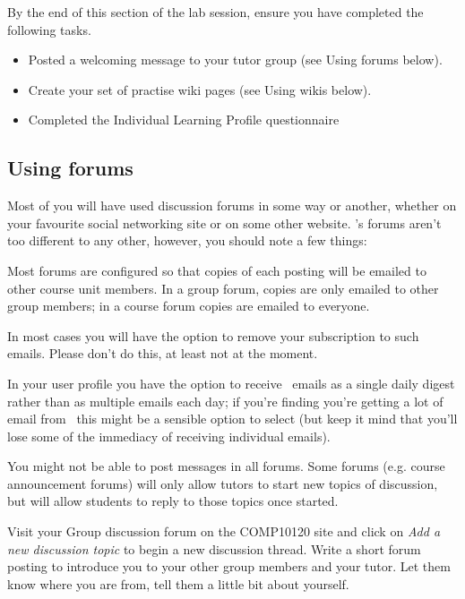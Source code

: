 By the end of this section of the lab session, ensure you have completed the following tasks.

\begin{itemize}
\item 
Posted a welcoming message to your tutor group (see Using forums below).

\item Create your set of practise wiki pages (see Using wikis below).

\item Completed the Individual Learning Profile questionnaire
\end{itemize}


\subsection{Using forums}
\label{sec:using-forums}


Most of you will have used discussion forums in some way or another, whether on your favourite social networking site or on some other website. \Moodle's forums aren't too different to any other, however, you should note a few things:

Most forums are configured so that copies of each posting will be emailed to other course unit members. In a group forum, copies are only emailed to other group members; in a course forum copies are emailed to everyone.

In most cases you will have the option to remove your subscription to such emails. Please don't do this, at least not at the moment.

In your user profile you have the option to receive \moodle\ emails as a single daily digest rather than as multiple emails each day; if you're finding you're getting a lot of email from \moodle\ this might be a sensible option to select (but keep it mind that you'll lose some of the immediacy of receiving individual emails). 

You might not be able to post messages in all forums. Some forums (e.g. course announcement forums) will only allow tutors to start new topics of discussion, but will allow students to reply to those topics once started.

Visit your Group discussion forum on the COMP10120 site and click on \emph{Add a new discussion topic}  to begin a new discussion thread. Write a short forum posting to introduce you to your other group members and your tutor. Let them know where you are from, tell them a little bit about yourself.

